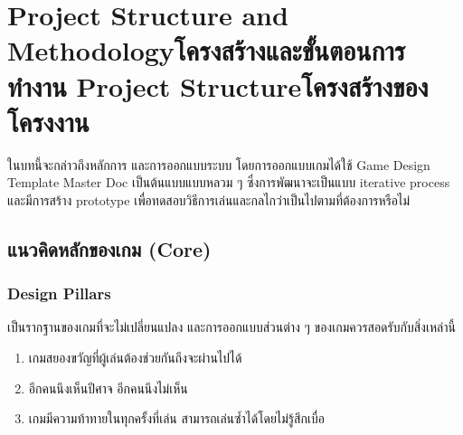 \chapter{\ifproject%
\ifenglish Project Structure and Methodology\else โครงสร้างและขั้นตอนการทำงาน\fi
\else%
\ifenglish Project Structure\else โครงสร้างของโครงงาน\fi
\fi
}

ในบทนี้จะกล่าวถึงหลักการ และการออกแบบระบบ โดยการออกแบบเกมได้ใช้ Game Design Template Master Doc \cite{GDD1, GDD2} เป็นต้นแบบแบบหลวม ๆ ซึ่งการพัฒนาจะเป็นแบบ iterative process และมีการสร้าง prototype เพื่อทดสอบวิธีการเล่นและกลไกว่าเป็นไปตามที่ต้องการหรือไม่

\makeatletter


\makeatother

\section{แนวคิดหลักของเกม (Core)}

\subsection{Design Pillars}

เป็นรากฐานของเกมที่จะไม่เปลี่ยนแปลง และการออกแบบส่วนต่าง ๆ ของเกมควรสอดรับกับสิ่งเหล่านี้ \cite{GDD1}

\begin{enumerate}
  \item เกมสยองขวัญที่ผู้เล่นต้องช่วยกันถึงจะผ่านไปได้
  \item อีกคนนึงเห็นปีศาจ อีกคนนึงไม่เห็น
  \item เกมมีความท้าทายในทุกครั้งที่เล่น สามารถเล่นซ้ำได้โดยไม่รู้สึกเบื่อ
\end{enumerate}

